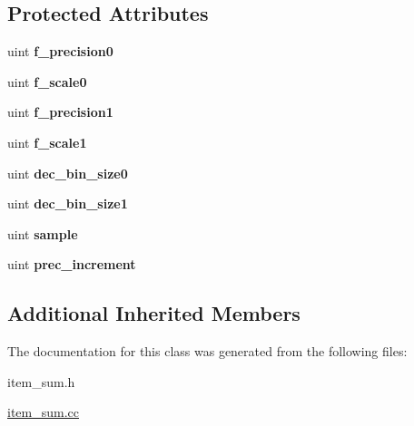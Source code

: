 \subsection*{Protected Attributes}
\begin{DoxyCompactItemize}
\item 
\mbox{\label{classItem__variance__field_a08cb92951abe64087644214c7bb82e15}} 
uint {\bfseries f\+\_\+precision0}
\item 
\mbox{\label{classItem__variance__field_a202b4152d9c703c89d436e9c65c4821c}} 
uint {\bfseries f\+\_\+scale0}
\item 
\mbox{\label{classItem__variance__field_abfebc0ca2a16e34ac1a7903f8d065229}} 
uint {\bfseries f\+\_\+precision1}
\item 
\mbox{\label{classItem__variance__field_aab45a59f6775afe7d9a80dcf29465412}} 
uint {\bfseries f\+\_\+scale1}
\item 
\mbox{\label{classItem__variance__field_aea9335f0d8c6d5a54db8a9fea929f346}} 
uint {\bfseries dec\+\_\+bin\+\_\+size0}
\item 
\mbox{\label{classItem__variance__field_aaa733b9b08f5cd05e57fc8794002325a}} 
uint {\bfseries dec\+\_\+bin\+\_\+size1}
\item 
\mbox{\label{classItem__variance__field_a83ba7d14be291632a2ae35945f2395f4}} 
uint {\bfseries sample}
\item 
\mbox{\label{classItem__variance__field_a6252a506d5d802c59d3c01717129e408}} 
uint {\bfseries prec\+\_\+increment}
\end{DoxyCompactItemize}
\subsection*{Additional Inherited Members}


The documentation for this class was generated from the following files\+:\begin{DoxyCompactItemize}
\item 
item\+\_\+sum.\+h\item 
\mbox{\hyperlink{item__sum_8cc}{item\+\_\+sum.\+cc}}\end{DoxyCompactItemize}
